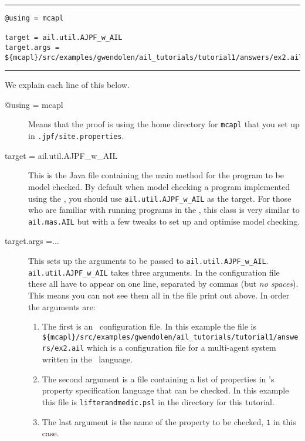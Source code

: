 \newpage
\noindent\rule{\textwidth}{1pt}
\begin{small}
\begin{verbatim}
@using = mcapl

target = ail.util.AJPF_w_AIL
target.args = ${mcapl}/src/examples/gwendolen/ail_tutorials/tutorial1/answers/ex2.ail,${mcapl}/src/examples/gwendolen/ajpf_tutorials/tutorial1/lifterandmedic.psl,1

\end{verbatim}
\end{small}
\rule{\textwidth}{1pt}

We explain each line of this below.

\begin{sloppypar}
\begin{description}
\item[@using = mcapl] Means that the proof is using the home directory for \texttt{mcapl} that you set up in \texttt{.jpf/site.properties}.
\item[target = ail.util.AJPF\_w\_AIL] This is the Java file containing the main method for the program to be model checked.  By default when model checking a program implemented using the \ail, you should use \texttt{ail.util.AJPF\_w\_AIL} as the target.  For those who are familiar with running programs in the \ail, this class is very similar to \texttt{ail.mas.AIL} but with a few tweaks to set up and optimise model checking.
\item[target.args =...] This sets up the arguments to be passed to \texttt{ail.util.AJPF\_w\_AIL}.  \texttt{ail.util.AJPF\_w\_AIL} takes three arguments.  In the configuration file these all have to appear on one line, separated by commas (but \emph{no spaces}).  This means you can not see them all in the file print out above.  In order the arguments are:
\begin{enumerate}
\item The first is an \ail\ configuration file.  In this example the file is \texttt{\$\{mcapl\}/src/examples/gwendolen/ail\_tutorials/tutorial1/answers/ex2.ail} which is a configuration file for a multi-agent system written in the \gwendolen\ language.
\item The second argument is a file containing a list of properties in \ajpf's property specification language that can be checked.  In this example this file is \texttt{lifterandmedic.psl} in the directory for this tutorial.
\item The last argument is the name of the property to be checked, \texttt{1} in this case.
\end{enumerate}
\end{description}
\end{sloppypar}

